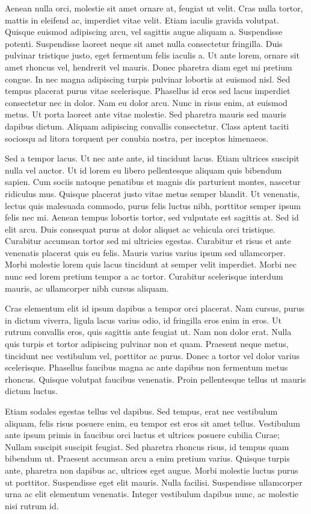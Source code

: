 Aenean nulla orci, molestie sit amet ornare at, feugiat ut velit.
Cras nulla tortor, mattis in eleifend ac, imperdiet vitae velit.
Etiam iaculis gravida volutpat.
Quisque euismod adipiscing arcu, vel sagittis augue aliquam a.
Suspendisse potenti.
Suspendisse laoreet neque sit amet nulla consectetur fringilla.
Duis pulvinar tristique justo, eget fermentum felis iaculis a.
Ut ante lorem, ornare sit amet rhoncus vel, hendrerit vel mauris.
Donec pharetra diam eget mi pretium congue.
In nec magna adipiscing turpis pulvinar lobortis at euismod nisl.
Sed tempus placerat purus vitae scelerisque.
Phasellus id eros sed lacus imperdiet consectetur nec in dolor.
Nam eu dolor arcu.
Nunc in risus enim, at euismod metus.
Ut porta laoreet ante vitae molestie.
Sed pharetra mauris sed mauris dapibus dictum.
Aliquam adipiscing convallis consectetur.
Class aptent taciti sociosqu ad litora torquent per conubia nostra, per inceptos himenaeos.

Sed a tempor lacus.
Ut nec ante ante, id tincidunt lacus.
Etiam ultrices suscipit nulla vel auctor.
Ut id lorem eu libero pellentesque aliquam quis bibendum sapien.
Cum sociis natoque penatibus et magnis dis parturient montes, nascetur ridiculus mus.
Quisque placerat justo vitae metus semper blandit.
Ut venenatis, lectus quis malesuada commodo, purus felis luctus nibh, porttitor semper ipsum felis nec mi.
Aenean tempus lobortis tortor, sed vulputate est sagittis at.
Sed id elit arcu.
Duis consequat purus at dolor aliquet ac vehicula orci tristique.
Curabitur accumsan tortor sed mi ultricies egestas.
Curabitur et risus et ante venenatis placerat quis eu felis.
Mauris varius varius ipsum sed ullamcorper.
Morbi molestie lorem quis lacus tincidunt at semper velit imperdiet.
Morbi nec nunc sed lorem pretium tempor a ac tortor.
Curabitur scelerisque interdum mauris, ac ullamcorper nibh cursus aliquam.

Cras elementum elit id ipsum dapibus a tempor orci placerat.
Nam cursus, purus in dictum viverra, ligula lacus varius odio, id fringilla eros enim in eros.
Ut rutrum convallis eros, quis sagittis ante feugiat ut.
Nam non dolor erat.
Nulla quis turpis et tortor adipiscing pulvinar non et quam.
Praesent neque metus, tincidunt nec vestibulum vel, porttitor ac purus.
Donec a tortor vel dolor varius scelerisque.
Phasellus faucibus magna ac ante dapibus non fermentum metus rhoncus.
Quisque volutpat faucibus venenatis.
Proin pellentesque tellus ut mauris dictum luctus.

Etiam sodales egestas tellus vel dapibus.
Sed tempus, erat nec vestibulum aliquam, felis risus posuere enim, eu tempor est eros sit amet tellus.
Vestibulum ante ipsum primis in faucibus orci luctus et ultrices posuere cubilia Curae; Nullam suscipit suscipit feugiat.
Sed pharetra rhoncus risus, id tempus quam bibendum ut.
Praesent accumsan arcu a enim pretium varius.
Quisque turpis ante, pharetra non dapibus ac, ultrices eget augue.
Morbi molestie luctus purus ut porttitor.
Suspendisse eget elit mauris.
Nulla facilisi.
Suspendisse ullamcorper urna ac elit elementum venenatis.
Integer vestibulum dapibus nunc, ac molestie nisi rutrum id.

